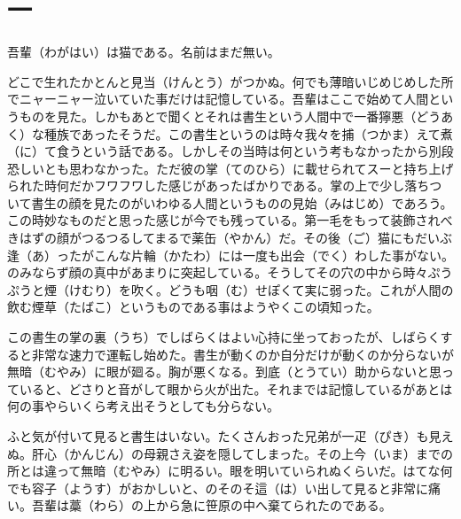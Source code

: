 \documentclass{book}
\begin{document}
\chapter*{一}

吾輩（わがはい）は猫である。名前はまだ無い。

どこで生れたかとんと見当（けんとう）がつかぬ。何でも薄暗いじめじめした所でニャーニャー泣いていた事だけは記憶している。吾輩はここで始めて人間というものを見た。しかもあとで聞くとそれは書生という人間中で一番獰悪（どうあく）な種族であったそうだ。この書生というのは時々我々を捕（つかま）えて煮（に）て食うという話である。しかしその当時は何という考もなかったから別段恐しいとも思わなかった。ただ彼の掌（てのひら）に載せられてスーと持ち上げられた時何だかフワフワした感じがあったばかりである。掌の上で少し落ちついて書生の顔を見たのがいわゆる人間というものの見始（みはじめ）であろう。この時妙なものだと思った感じが今でも残っている。第一毛をもって装飾されべきはずの顔がつるつるしてまるで薬缶（やかん）だ。その後（ご）猫にもだいぶ逢（あ）ったがこんな片輪（かたわ）には一度も出会（でく）わした事がない。のみならず顔の真中があまりに突起している。そうしてその穴の中から時々ぷうぷうと煙（けむり）を吹く。どうも咽（む）せぽくて実に弱った。これが人間の飲む煙草（たばこ）というものである事はようやくこの頃知った。

この書生の掌の裏（うち）でしばらくはよい心持に坐っておったが、しばらくすると非常な速力で運転し始めた。書生が動くのか自分だけが動くのか分らないが無暗（むやみ）に眼が廻る。胸が悪くなる。到底（とうてい）助からないと思っていると、どさりと音がして眼から火が出た。それまでは記憶しているがあとは何の事やらいくら考え出そうとしても分らない。

ふと気が付いて見ると書生はいない。たくさんおった兄弟が一疋（ぴき）も見えぬ。肝心（かんじん）の母親さえ姿を隠してしまった。その上今（いま）までの所とは違って無暗（むやみ）に明るい。眼を明いていられぬくらいだ。はてな何でも容子（ようす）がおかしいと、のそのそ這（は）い出して見ると非常に痛い。吾輩は藁（わら）の上から急に笹原の中へ棄てられたのである。
\end{document}
